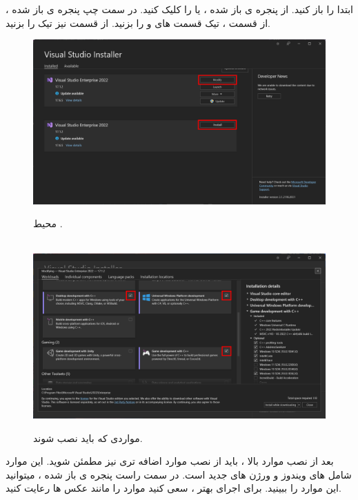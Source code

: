 {\large
ابتدا  را باز کنید. از پنجره ی باز شده ،  یا  را کلیک کنید. در سمت چپ پنجره ی باز شده ، از قسمت  ، تیک قسمت های  و  را بزنید.
از قسمت  نیز تیک  را بزنید.

    \begin{figure}[H]
        \centering
        \setlength{\belowcaptionskip}{-10pt}
        \includegraphics[width=\textwidth]{Images/1.Intro.2.1.png}
        \caption{محیط .}
        \\[20pt]
        \includegraphics[width=\textwidth]{Images/1.Intro.2.2.png}
        \caption{مواردی که باید نصب شوند.}
    \end{figure}

    بعد از نصب موارد بالا ، باید از نصب موارد اضافه تری نیز مطمئن شوید. این موارد شامل  های ویندوز و ورژن های جدید  است.
    در سمت راست پنجره ی باز شده ، میتوانید این موارد را ببینید. برای اجرای بهتر ، سعی کنید موارد را مانند عکس ها رعایت کنید.

}
